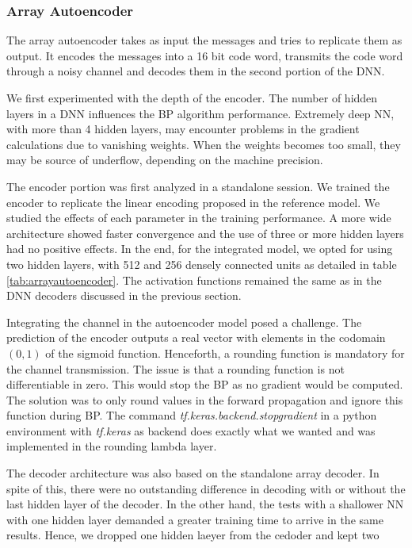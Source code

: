 \documentclass[conference]{IEEEtran}
\begin{document}
\subsubsection{Array Autoencoder}

The array autoencoder takes as input the messages and tries to replicate them as output. It encodes the messages into a 16 bit code word, transmits the code word through a noisy channel and decodes them in the second portion of the DNN.

We first experimented with the depth of the encoder. The number of hidden layers in a DNN influences the BP algorithm performance. Extremely deep NN, with more than 4 hidden layers, may encounter problems in the gradient calculations due to vanishing weights. When the weights becomes too small, they may be source of underflow, depending on the machine precision. 

The encoder portion was first analyzed in a standalone session. We trained the encoder to replicate the linear encoding proposed in the reference model. We studied the effects of each parameter in the training performance. A more wide architecture showed faster convergence and the use of three or more hidden layers had no positive effects. In the end, for the integrated model, we opted for using two hidden layers, with 512 and 256 densely connected units as detailed in table \ref{tab:arrayautoencoder}. The activation functions remained the same as in the DNN decoders discussed in the previous section.

Integrating the channel in the autoencoder model posed a challenge.  The prediction of the encoder outputs a real vector with elements in the codomain $(0,1)$ of the sigmoid function. Henceforth, a rounding function is mandatory for the channel transmission. The issue is that a rounding function is not differentiable in zero. This would stop the BP as no gradient would be computed. The solution was to only round values in the forward propagation and ignore this function during BP. The command \textit{tf.keras.backend.stop\textunderscore gradient} in a python environment with \textit{tf.keras} as backend does exactly what we wanted and was implemented in the rounding lambda layer. 

The decoder architecture was also based on the standalone array decoder. In spite of this, there were no outstanding difference in decoding with or without the last hidden layer of the decoder. In the other hand, the tests with a shallower NN with one hidden layer demanded a greater training time to arrive in the same results. Hence, we dropped one hidden laeyer from the cedoder and kept two
\end{document}
